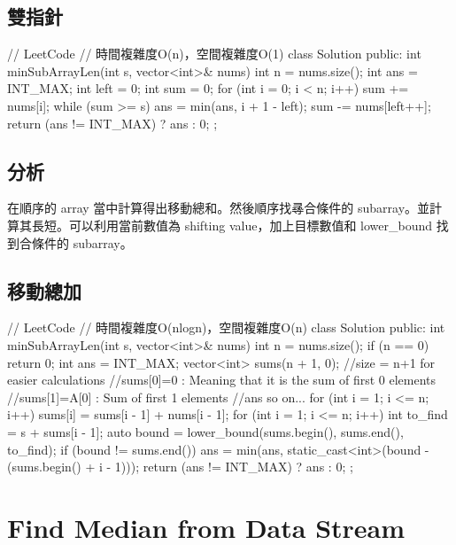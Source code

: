 \subsection{雙指針}
\begin{Code}
// LeetCode
// 時間複雜度O(n)，空間複雜度O(1)
class Solution {
public:
    int minSubArrayLen(int s, vector<int>& nums)
    {
        int n = nums.size();
        int ans = INT_MAX;
        int left = 0;
        int sum = 0;
        for (int i = 0; i < n; i++) {
            sum += nums[i];
            while (sum >= s) {
                ans = min(ans, i + 1 - left);
                sum -= nums[left++];
            }
        }
        return (ans != INT_MAX) ? ans : 0;
    }
};
\end{Code}


\subsection{分析}
在順序的 array 當中計算得出移動總和。然後順序找㝷合條件的 subarray。並計算其長短。可以利用當前數值為 shifting value，加上目標數值和 lower_bound 找到合條件的 subarray。

\subsection{移動總加}
\begin{Code}
// LeetCode
// 時間複雜度O(nlogn)，空間複雜度O(n)
class Solution {
public:
    int minSubArrayLen(int s, vector<int>& nums)
    {
        int n = nums.size();
        if (n == 0)
            return 0;
        int ans = INT_MAX;
        vector<int> sums(n + 1, 0); //size = n+1 for easier calculations
        //sums[0]=0 : Meaning that it is the sum of first 0 elements
        //sums[1]=A[0] : Sum of first 1 elements
        //ans so on...
        for (int i = 1; i <= n; i++)
            sums[i] = sums[i - 1] + nums[i - 1];
        for (int i = 1; i <= n; i++) {
            int to_find = s + sums[i - 1];
            auto bound = lower_bound(sums.begin(), sums.end(), to_find);
            if (bound != sums.end()) {
                ans = min(ans, static_cast<int>(bound - (sums.begin() + i - 1)));
            }
        }
        return (ans != INT_MAX) ? ans : 0;
    }
};
\end{Code}

\section{Find Median from Data Stream}
\label{sec:find-median-from-data-stream}

